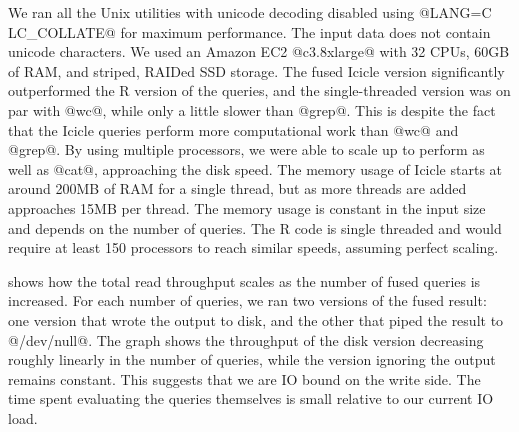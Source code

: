 We ran all the Unix utilities with unicode decoding disabled using @LANG=C LC_COLLATE@ for maximum performance. The input data does not contain unicode characters. 
We used an Amazon EC2 @c3.8xlarge@ with 32 CPUs, 60GB of RAM, and striped, RAIDed SSD storage. The fused Icicle version significantly outperformed the R version of the queries, and the single-threaded version was on par with @wc@, while only a little slower than @grep@. This is despite the fact that the Icicle queries perform more computational work than @wc@ and @grep@. By using multiple processors, we were able to scale up to perform as well as @cat@, approaching the disk speed.
The memory usage of Icicle starts at around 200MB of RAM for a single thread, but as more threads are added approaches 15MB per thread.
The memory usage is constant in the input size and depends on the number of queries.
The R code is single threaded and would require at least 150 processors to reach similar speeds, assuming perfect scaling.









 shows how the total read throughput scales as the number of fused queries is increased.
For each number of queries, we ran two versions of the fused result: one version that wrote the output to disk, and the other that piped the result to @/dev/null@.
The graph shows the throughput of the disk version decreasing roughly linearly in the number of queries, while the version ignoring the output remains constant.
This suggests that we are IO bound on the write side.
The time spent evaluating the queries themselves is small relative to our current IO load.

